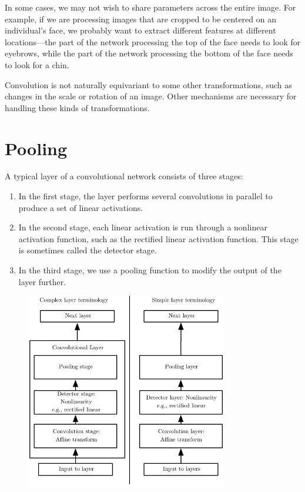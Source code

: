 \documentclass{report}
\begin{document}
In some cases, we may not wish to share parameters across the entire image. For example, if we are processing images that are cropped to be centered on an individual’s face, we probably want to extract different features at diﬀerent locations—the part of the network processing the top of the face needs to look for eyebrows, while the part of the network processing the bottom of the face needs to look for a chin.

Convolution is not naturally equivariant to some other transformations, such as changes in the scale or rotation of an image. Other mechanisms are necessary for handling these kinds of transformations.

\section{Pooling}
A typical layer of a convolutional network consists of three stages: 
\begin{enumerate}
	\item In the ﬁrst stage, the layer performs several convolutions in parallel to produce a set of linear activations. 
	\item In the second stage, each linear activation is run through a nonlinear activation function, such as the rectiﬁed linear activation function. This stage is sometimes called the detector stage. 
	\item In the third stage, we use a pooling function to modify the output of the layer further.
	\end{enumerate}

	\begin{figure}[ht]
	\includegraphics[width=250pt]{31}
	\centering
\end{figure}
\end{document}
